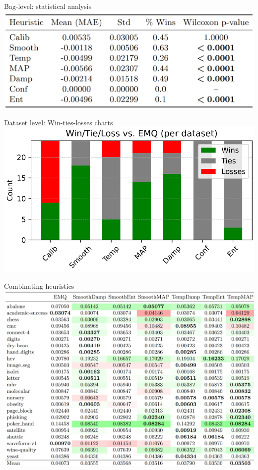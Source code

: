 \documentclass[aspectratio=169]{beamer}
\begin{document}
\begin{frame}{Bag-level: statistical analysis}
  \centering
  \includegraphics[width=0.6\linewidth]{images/statistical_analysis.png}
\end{frame}

\begin{frame}{Dataset level: Win-ties-losses charts}
  \centering
    \includegraphics[width=0.6\linewidth]{images/datasetlevel.png}
\end{frame}

\begin{frame}{Combinating heuristics}
  \centering
    \includegraphics[width=0.6\linewidth]{images/combinations.png}
\end{frame}
\end{document}
